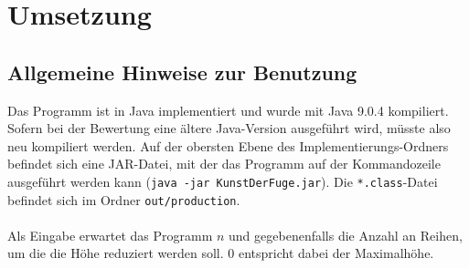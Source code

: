 \documentclass[a4paper, notitlepage, 12pt]{scrartcl}
\begin{document}
\section{Umsetzung}
\subsection{Allgemeine Hinweise zur Benutzung}
Das Programm ist in Java implementiert und wurde mit Java 9.0.4 kompiliert. Sofern bei der Bewertung eine ältere Java-Version ausgeführt wird, müsste also neu kompiliert werden. Auf der obersten Ebene des Implementierungs-Ordners befindet sich eine JAR-Datei, mit der das Programm auf der Kommandozeile ausgeführt werden kann (\texttt{java -jar KunstDerFuge.jar}). Die \texttt{*.class}-Datei befindet sich im Ordner \texttt{out/production}. \\ \\
Als Eingabe erwartet das Programm $n$ und gegebenenfalls die Anzahl an Reihen, um die die Höhe reduziert werden soll. 0 entspricht dabei der Maximalhöhe.
\end{document}
